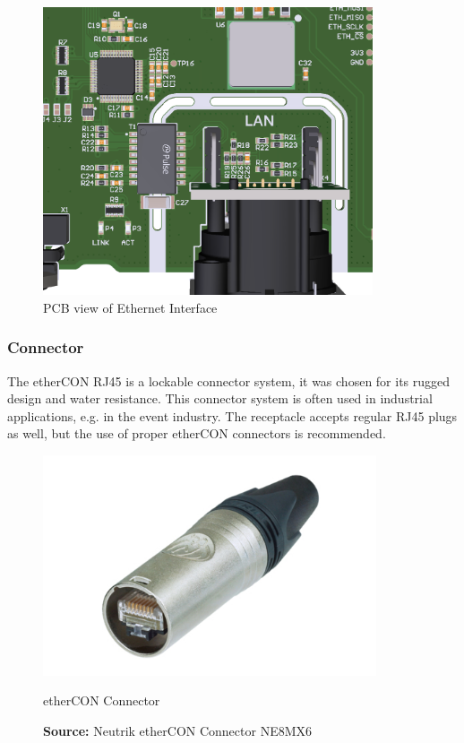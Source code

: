 \begin{figure}[h!]
	\centering
	\includegraphics[height=8.5cm]{images/eth-pcb}
	\vspace{0.2cm}
	\caption{PCB view of Ethernet Interface}
	\label{fig:eth-pcb}
\end{figure}
\newpage

\subsubsection{Connector}
The etherCON RJ45 is a lockable connector system, it was chosen for its rugged design and water resistance. This connector system is often used in industrial applications, e.g. in the event industry. The receptacle accepts regular RJ45 plugs as well, but the use of proper etherCON connectors is recommended.

\begin{figure}[h!]
	\centering
	\includegraphics[height=6.5cm]{images/ethercon.jpg}
	\caption{etherCON Connector}
	\vspace{-1.4ex}
	\caption*{\textbf{Source:} Neutrik etherCON Connector NE8MX6 \cite{neutrik-ethercon}}
	\label{fig:neutrik-ethercon}
\end{figure}


